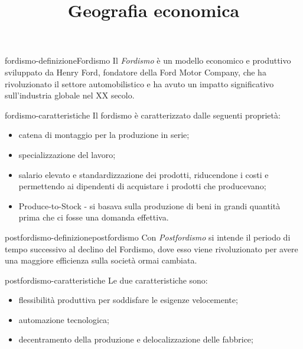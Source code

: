 \documentclass[preview]{standalone}
\begin{document}
\title{Geografia economica}
\genpage

\begin{snippetdefinition}{fordismo-definizione}{Fordismo}
    Il \textit{Fordismo} è un modello economico e produttivo sviluppato da Henry Ford,
    fondatore della Ford Motor Company, che ha rivoluzionato il settore automobilistico
    e ha avuto un impatto significativo sull'industria globale nel XX secolo.
\end{snippetdefinition}

\begin{snippet}{fordismo-caratteristiche}
    Il fordismo è caratterizzato dalle seguenti proprietà:
    \begin{itemize}
        \item catena di montaggio per la produzione in serie;
        \item specializzazione del lavoro;
        \item salario elevato e standardizzazione dei prodotti, riducendone i costi e permettendo ai dipendenti di acquistare i prodotti che producevano;
        \item Produce-to-Stock - si basava sulla produzione di beni in grandi quantità prima che ci fosse una domanda effettiva.
    \end{itemize}
\end{snippet}

\begin{snippetdefinition}{postfordismo-definizione}{postfordismo}
    Con \textit{Postfordismo} si intende il periodo di tempo
    successivo al declino del Fordismo, dove esso viene rivoluzionato per avere una maggiore efficienza
    sulla società ormai cambiata.
\end{snippetdefinition}

\begin{snippet}{postfordismo-caratteristiche}
    Le due caratteristiche sono:
    \begin{itemize}
        \item flessibilità produttiva per soddisfare le esigenze velocemente;
        \item automazione tecnologica;
        \item decentramento della produzione e delocalizzazione delle fabbrice;
    \end{itemize}
\end{snippet}
\end{document}
